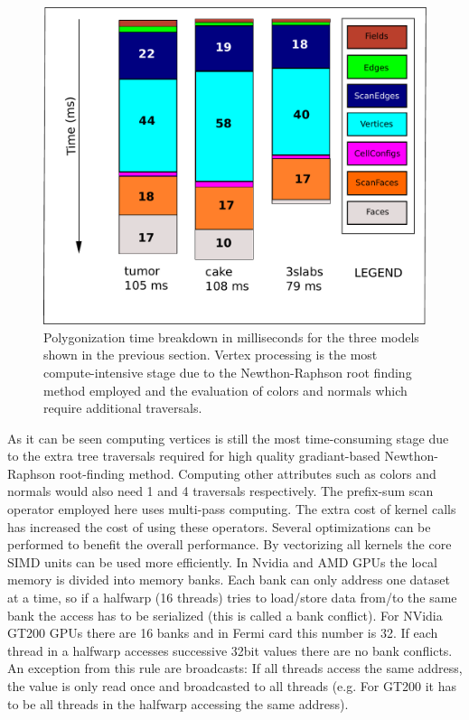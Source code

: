 
\begin{figure}[H]
  \centering
  \includegraphics[width=0.8\linewidth]{figures/gpupoly/breakdownpoly.pdf}
  \caption{\label{fig:breakdownpoly}
  {Polygonization time breakdown in milliseconds for the three models shown in the previous section. Vertex processing is the most compute-intensive
  stage due to the Newthon-Raphson root finding method employed and the evaluation of colors and normals which require additional traversals.
  }
}
\end{figure}

As it can be seen computing vertices is still the most time-consuming stage due to the extra tree traversals required for high quality 
gradiant-based Newthon-Raphson root-finding method. Computing other attributes such as colors and normals would also need 1 and 4 
traversals respectively. The prefix-sum scan operator employed here uses multi-pass computing. The extra cost of kernel calls has
increased the cost of using these operators. Several optimizations can be performed to benefit the overall performance. By 
vectorizing all kernels the core SIMD units can be used more efficiently. 
In Nvidia and AMD GPUs the local memory is divided into memory banks. Each bank can only address one dataset at a time, so if a halfwarp (16 threads)
tries to load/store data from/to the same bank the access has to be serialized (this is called a bank conflict). 
For NVidia GT200 GPUs there are 16 banks and in Fermi card this number is 32. If each thread in a halfwarp accesses successive 32bit values
there are no bank conflicts. An exception from this rule are broadcasts: If all threads access the same address, the value is only read once and
broadcasted to all threads (e.g. For GT200 it has to be all threads in the halfwarp accessing the same address).

